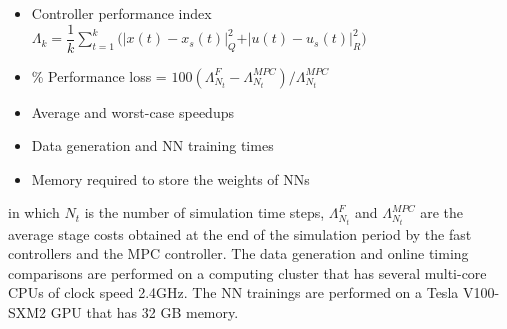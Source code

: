 \documentclass[preprint,5p, twocolumn, authoryear]{elsarticle}
\begin{document}
\begin{itemize}
    \item Controller performance index \\
    $\Lambda_k = \dfrac{1}{k}\sum_{t=1}^{k} \big(\vert x(t) - x_{s} (t) \vert^2_{Q} + \vert u(t) - u_{s} (t) \vert^2_{R} \big)$
    \item \% Performance loss = $100(\Lambda^{F}_{N_{t}} - \Lambda^{MPC}_{N_{t}})/\Lambda^{MPC}_{N_{t}}$
    \item Average and worst-case speedups
    \item Data generation and NN training times
    \item Memory required to store the weights of NNs
\end{itemize}
in which $N_t$ is the number of simulation time steps,  
$\Lambda^{F}_{N_{t}}$ and $\Lambda^{MPC}_{N_{t}}$
are the average stage costs obtained 
at the end of the simulation period by the 
fast controllers and the MPC controller.
The data generation and online timing comparisons are 
performed on a computing cluster that has 
several multi-core CPUs of clock speed 2.4GHz. 
The NN trainings are performed on a 
Tesla V100-SXM2 GPU that has 32 GB memory.
\end{document}

